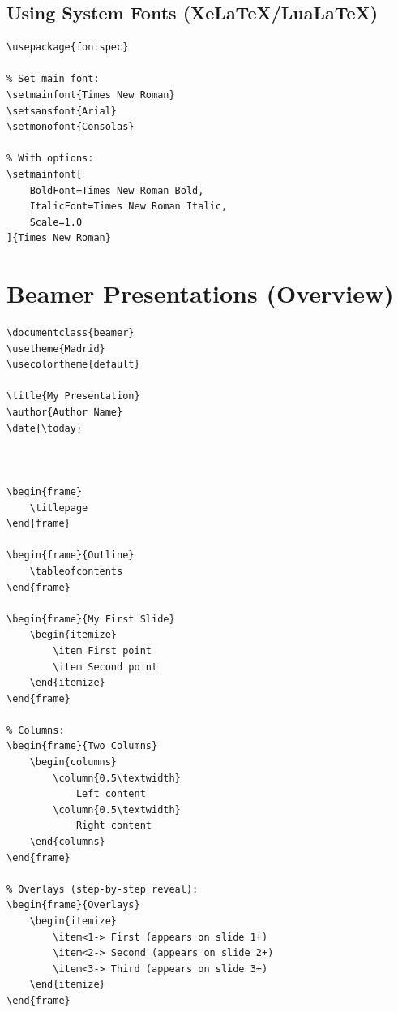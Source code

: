 \subsection{Using System Fonts (XeLaTeX/LuaLaTeX)}

\begin{lstlisting}[caption=System fonts with fontspec]
% Requires XeLaTeX or LuaLaTeX
\usepackage{fontspec}

% Set main font:
\setmainfont{Times New Roman}
\setsansfont{Arial}
\setmonofont{Consolas}

% With options:
\setmainfont[
    BoldFont=Times New Roman Bold,
    ItalicFont=Times New Roman Italic,
    Scale=1.0
]{Times New Roman}
\end{lstlisting}

\section{Beamer Presentations (Overview)}

\begin{lstlisting}[language={[LaTeX]TeX}, caption=Beamer basics]
\documentclass{beamer}
\usetheme{Madrid}
\usecolortheme{default}

\title{My Presentation}
\author{Author Name}
\date{\today}



\begin{frame}
    \titlepage
\end{frame}

\begin{frame}{Outline}
    \tableofcontents
\end{frame}

\begin{frame}{My First Slide}
    \begin{itemize}
        \item First point
        \item Second point
    \end{itemize}
\end{frame}

% Columns:
\begin{frame}{Two Columns}
    \begin{columns}
        \column{0.5\textwidth}
            Left content
        \column{0.5\textwidth}
            Right content
    \end{columns}
\end{frame}

% Overlays (step-by-step reveal):
\begin{frame}{Overlays}
    \begin{itemize}
        \item<1-> First (appears on slide 1+)
        \item<2-> Second (appears on slide 2+)
        \item<3-> Third (appears on slide 3+)
    \end{itemize}
\end{frame}

\end{lstlisting}

